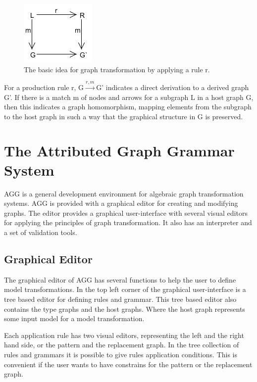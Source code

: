 \documentclass[pdftex,11pt,a4paper]{article}
\begin{document}
\begin{figure}[H]
	\centering
	\includegraphics[scale=0.7]{figures/GraphTransformationGeneral.png}
	\caption{The basic idea for graph transformation by applying a rule r.}
	\label{fig:GraphTransformationGeneral}
\end{figure}

For a production rule r, \mbox{G$\xrightarrow{r,m}$G'} indicates a direct
derivation to a derived graph G'. If there is a match m of nodes and arrows for a
subgraph L in a host graph G, then this indicates a graph homomorphism, mapping
elements from the subgraph to the host graph in such a way that the graphical
structure in G is preserved.

\section{The Attributed Graph Grammar System}

\noindent AGG is a general development environment for algebraic graph
transformation systems. AGG is provided with a graphical editor for creating
and modifying graphs. The editor provides a graphical user-interface with
several visual editors for applying the principles of graph transformation. It
also has an interpreter and a set of validation tools.

\subsection{Graphical Editor}
\noindent The graphical editor of AGG has several functions to help the user to
define model transformations. In the top left corner of the graphical user-interface is
a tree based editor for defining rules and grammar. This tree based editor also
contains the type graphs and the host graphs. Where the host graph represents
some input model for a model transformation.

\indent Each application rule has two visual editors, representing the left and
the right hand side, or the pattern and the replacement graph. In the tree
collection of rules and grammars it is possible to give rules application
conditions. This is convenient if the user wants to have constrains for the
pattern or the replacement graph. 
\end{document}
